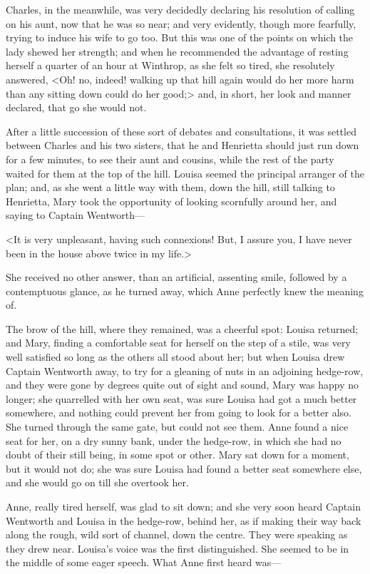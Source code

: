Charles, in the meanwhile, was very decidedly declaring his resolution of calling on his aunt, now that he was so near; and very evidently, though more fearfully, trying to induce his wife to go too. But this was one of the points on which the lady shewed her strength; and when he recommended the advantage of resting herself a quarter of an hour at Winthrop, as she felt so tired, she resolutely answered, <Oh! no, indeed! walking up that hill again would do her more harm than any sitting down could do her good;> and, in short, her look and manner declared, that go she would not.

After a little succession of these sort of debates and consultations, it was settled between Charles and his two sisters, that he and Henrietta should just run down for a few minutes, to see their aunt and cousins, while the rest of the party waited for them at the top of the hill. Louisa seemed the principal arranger of the plan; and, as she went a little way with them, down the hill, still talking to Henrietta, Mary took the opportunity of looking scornfully around her, and saying to Captain Wentworth—

<It is very unpleasant, having such connexions! But, I assure you, I have never been in the house above twice in my life.>

She received no other answer, than an artificial, assenting smile, followed by a contemptuous glance, as he turned away, which Anne perfectly knew the meaning of.

The brow of the hill, where they remained, was a cheerful spot: Louisa returned; and Mary, finding a comfortable seat for herself on the step of a stile, was very well satisfied so long as the others all stood about her; but when Louisa drew Captain Wentworth away, to try for a gleaning of nuts in an adjoining hedge-row, and they were gone by degrees quite out of sight and sound, Mary was happy no longer; she quarrelled with her own seat, was sure Louisa had got a much better somewhere, and nothing could prevent her from going to look for a better also. She turned through the same gate, but could not see them. Anne found a nice seat for her, on a dry sunny bank, under the hedge-row, in which she had no doubt of their still being, in some spot or other. Mary sat down for a moment, but it would not do; she was sure Louisa had found a better seat somewhere else, and she would go on till she overtook her.

Anne, really tired herself, was glad to sit down; and she very soon heard Captain Wentworth and Louisa in the hedge-row, behind her, as if making their way back along the rough, wild sort of channel, down the centre. They were speaking as they drew near. Louisa's voice was the first distinguished. She seemed to be in the middle of some eager speech. What Anne first heard was—

